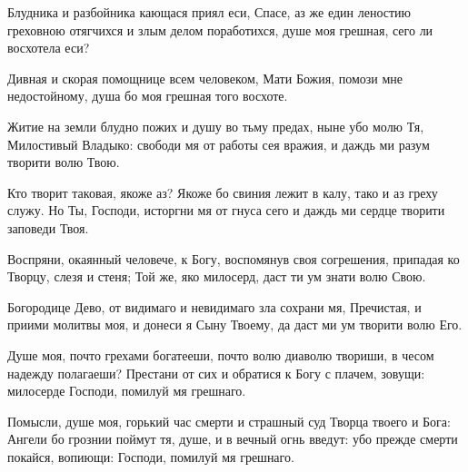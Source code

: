 \begin{mymulticols}
\slava

Блудника и разбойника кающася приял еси, Спасе, аз же един леностию греховною отягчихся и злым делом поработихся, душе моя грешная, сего ли восхотела еси?

\inyne

Дивная и скорая помощнице всем человеком, Мати Божия, помози мне недостойному, душа бо моя грешная того восхоте.




Житие на земли блудно пожих и душу во тьму предах, ныне убо молю Тя, Милостивый Владыко: свободи мя от работы сея вражия, и даждь ми разум творити волю Твою.


Кто творит таковая, якоже аз? Якоже бо свиния лежит в калу, тако и аз греху служу. Но Ты, Господи, исторгни мя от гнуса сего и даждь ми сердце творити заповеди Твоя.

\slava

Воспряни, окаянный человече, к Богу, воспомянув своя согрешения, припадая ко Творцу, слезя и стеня; Той же, яко милосерд, даст ти ум знати волю Свою.

\inyne

Богородице Дево, от видимаго и невидимаго зла сохрани мя, Пречистая, и приими молитвы моя, и донеси я Сыну Твоему, да даст ми ум творити волю Его.


Душе моя, почто грехами богатееши, почто волю диаволю твориши, в чесом надежду полагаеши? Престани от сих и обратися к Богу с плачем, зовущи: милосерде Господи, помилуй мя грешнаго.


Помысли, душе моя, горький час смерти и страшный суд Творца твоего и Бога: Ангели бо грознии поймут тя, душе, и в вечный огнь введут: убо прежде смерти покайся, вопиющи: Господи, помилуй мя грешнаго.





\end{mymulticols}
